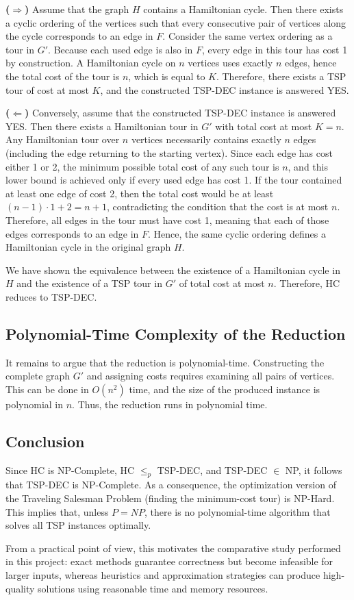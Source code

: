 \textbf{($\Rightarrow$)} Assume that the graph $H$ contains a Hamiltonian cycle. Then there exists a cyclic ordering of the vertices such that every consecutive pair of vertices along the cycle corresponds to an edge in $F$. Consider the same vertex ordering as a tour in $G'$. Because each used edge is also in $F$, every edge in this tour has cost 1 by construction. A Hamiltonian cycle on $n$ vertices uses exactly $n$ edges, hence the total cost of the tour is $n$, which is equal to $K$. Therefore, there exists a TSP tour of cost at most $K$, and the constructed TSP-DEC instance is answered YES.

\textbf{($\Leftarrow$)} Conversely, assume that the constructed TSP-DEC instance is answered YES. Then there exists a Hamiltonian tour in $G'$ with total cost at most $K = n$. Any Hamiltonian tour over $n$ vertices necessarily contains exactly $n$ edges (including the edge returning to the starting vertex). Since each edge has cost either 1 or 2, the minimum possible total cost of any such tour is $n$, and this lower bound is achieved only if every used edge has cost 1. If the tour contained at least one edge of cost 2, then the total cost would be at least $(n-1) \cdot 1 + 2 = n + 1$, contradicting the condition that the cost is at most $n$. Therefore, all edges in the tour must have cost 1, meaning that each of those edges corresponds to an edge in $F$. Hence, the same cyclic ordering defines a Hamiltonian cycle in the original graph $H$.

We have shown the equivalence between the existence of a Hamiltonian cycle in $H$ and the existence of a TSP tour in $G'$ of total cost at most $n$. Therefore, HC reduces to TSP-DEC.

\subsection{Polynomial-Time Complexity of the Reduction}

It remains to argue that the reduction is polynomial-time. Constructing the complete graph $G'$ and assigning costs requires examining all pairs of vertices. This can be done in $O(n^2)$ time, and the size of the produced instance is polynomial in $n$. Thus, the reduction runs in polynomial time.

\subsection{Conclusion}

Since HC is NP-Complete, HC $\le_p$ TSP-DEC, and TSP-DEC $\in$ NP, it follows that TSP-DEC is NP-Complete. As a consequence, the optimization version of the Traveling Salesman Problem (finding the minimum-cost tour) is NP-Hard. This implies that, unless $P = NP$, there is no polynomial-time algorithm that solves all TSP instances optimally.

From a practical point of view, this motivates the comparative study performed in this project: exact methods guarantee correctness but become infeasible for larger inputs, whereas heuristics and approximation strategies can produce high-quality solutions using reasonable time and memory resources.
